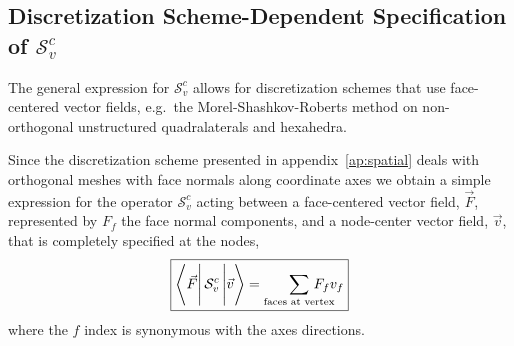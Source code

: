 \documentclass{article}
\newcommand{\bracket}[3]{%
  \ensuremath{%
       \left\langle {#1} \rule{0mm}{4ex} \right|%
       {#2} \left| {#3}  \rule{0mm}{4ex} \right\rangle%
  }%
}
\begin{document}
\subsection{Discretization Scheme-Dependent
            Specification of $\mathcal{S}^{c}_{v}$}

The general expression for $\mathcal{S}^{c}_{v}$ allows for discretization
schemes that use face-centered vector fields, e.g.\ the Morel-Shashkov-Roberts
method\cite{MorelShashkov}
 on non-orthogonal unstructured quadralaterals and hexahedra.

Since the discretization scheme presented in appendix~\ref{ap:spatial} deals
with orthogonal meshes with face normals along coordinate axes we obtain
a simple expression for the operator $\mathcal{S}^{c}_{v}$ acting between
a face-centered vector field, $\vec{F}$, represented by $F_{f}$ the face normal
components, and a node-center vector field, $\vec{v}$, that is completely
specified at the nodes,
\begin{equation}
 \boxed{
   \bracket{\vec{F}}{\mathcal{S}^{c}_{v}}{\vec{v}} =
       \sum_{\text{faces at vertex}} \!\!\!\!\!\!\!\!\!\! F_{f} v_{f}
 }
\end{equation}
where the $f$ index is synonymous with the axes directions.



\end{document}
